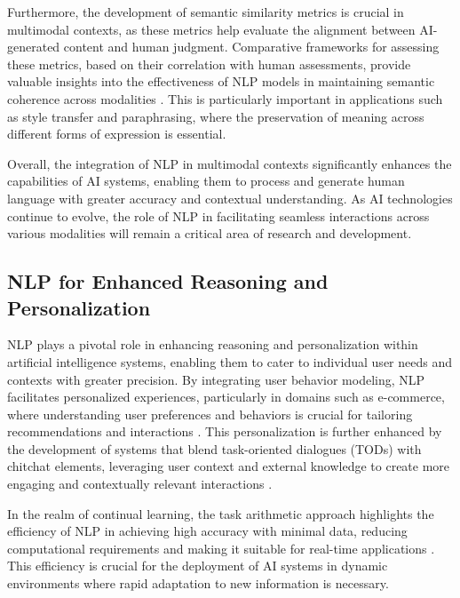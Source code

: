 Furthermore, the development of semantic similarity metrics is crucial in multimodal contexts, as these metrics help evaluate the alignment between AI-generated content and human judgment. Comparative frameworks for assessing these metrics, based on their correlation with human assessments, provide valuable insights into the effectiveness of NLP models in maintaining semantic coherence across modalities \cite{yamshchikov2020styletransferparaphraselookingsensible}. This is particularly important in applications such as style transfer and paraphrasing, where the preservation of meaning across different forms of expression is essential.



Overall, the integration of NLP in multimodal contexts significantly enhances the capabilities of AI systems, enabling them to process and generate human language with greater accuracy and contextual understanding. As AI technologies continue to evolve, the role of NLP in facilitating seamless interactions across various modalities will remain a critical area of research and development.



\subsection{NLP for Enhanced Reasoning and Personalization} \label{subsec:NLP for Enhanced Reasoning and Personalization}

NLP plays a pivotal role in enhancing reasoning and personalization within artificial intelligence systems, enabling them to cater to individual user needs and contexts with greater precision. By integrating user behavior modeling, NLP facilitates personalized experiences, particularly in domains such as e-commerce, where understanding user preferences and behaviors is crucial for tailoring recommendations and interactions \cite{ni2018perceiveusersdepthlearning}. This personalization is further enhanced by the development of systems that blend task-oriented dialogues (TODs) with chitchat elements, leveraging user context and external knowledge to create more engaging and contextually relevant interactions \cite{stricker2024enhancingtaskorienteddialogueschitchat}.



In the realm of continual learning, the task arithmetic approach highlights the efficiency of NLP in achieving high accuracy with minimal data, reducing computational requirements and making it suitable for real-time applications \cite{chitale2023taskarithmeticloracontinual}. This efficiency is crucial for the deployment of AI systems in dynamic environments where rapid adaptation to new information is necessary.



